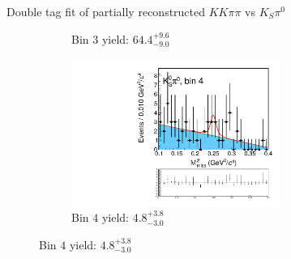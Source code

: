 \documentclass{beamer}
\begin{document}
\begin{frame}{Double tag fit of partially reconstructed $KK\pi\pi$ vs $K_S\pi^0$}
\begin{figure}
\begin{subfigure}{0.5\textwidth}
      \caption{Bin $3$ yield: $64.4_{-9.0}^{+9.6}$}
    \end{subfigure}%
    \begin{subfigure}{0.5\textwidth}
      \centering
      \includegraphics[width=0.75\textwidth,trim={0 5cm 0 0},clip=true]{Plots/DoubleTagYield_DoubleTag_CP_KKpipi_vs_KSpi0PartReco_SignalBin4.pdf}
      \caption{Bin $4$ yield: $4.8_{-3.0}^{+3.8}$}
    \end{subfigure}
  \end{figure}
\end{frame}
\end{document}
